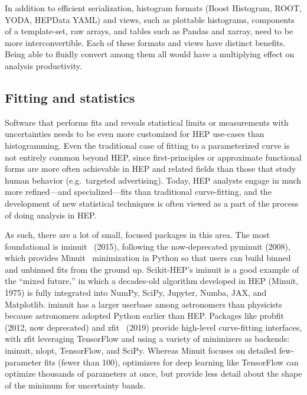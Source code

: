 \documentclass[12pt,a4paper]{article}
\begin{document}
In addition to efficient serialization, histogram formats (Boost Histogram, ROOT, YODA, HEPData YAML) and views, such as plottable histograms, components of a template-set, raw arrays, and tables such as Pandas and xarray, need to be more interconvertible. Each of these formats and views have distinct benefits. Being able to fluidly convert among them all would have a multiplying effect on analysis productivity.

\subsection{Fitting and statistics}

Software that performs fits and reveals statistical limits or measurements with uncertainties needs to be even more customized for HEP use-cases than histogramming. Even the traditional case of fitting to a parameterized curve is not entirely common beyond HEP, since first-principles or approximate functional forms are more often achievable in HEP and related fields than those that study human behavior (e.g.\ targeted advertising). Today, HEP analysts engage in much more refined---and specialized---fits than traditional curve-fitting, and the development of new statistical techniques is often viewed as a part of the process of doing analysis in HEP.

As such, there are a lot of small, focused packages in this area. The most foundational is iminuit~\cite{iminuit} (2015), following the now-deprecated pyminuit (2008), which provides Minuit~\cite{James:1975dr} minimization in Python so that users can build binned and unbinned fits from the ground up. Scikit-HEP's iminuit is a good example of the ``mixed future,'' in which a decades-old algorithm developed in HEP (Minuit, 1975) is fully integrated into NumPy, SciPy, Jupyter, Numba, JAX, and Matplotlib. iminuit has a larger userbase among astronomers than physicists because astronomers adopted Python earlier than HEP. Packages like probfit (2012, now deprecated) and zfit~\cite{Eschle:2020ghu} (2019) provide high-level curve-fitting interfaces, with zfit leveraging TensorFlow and using a variety of minimizers as backends: iminuit, nlopt, TensorFlow, and SciPy. Whereas Minuit focuses on detailed few-parameter fits (fewer than 100), optimizers for deep learning like TensorFlow can optimize thousands of parameters at once, but provide less detail about the shape of the minimum for uncertainty bands.
\end{document}
